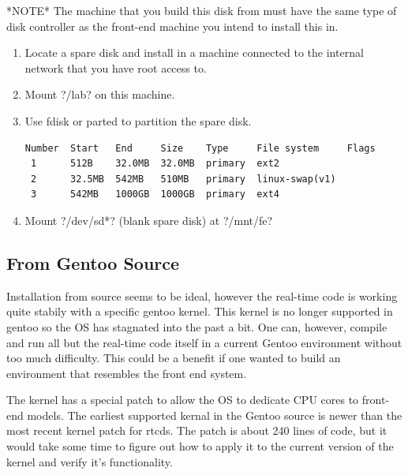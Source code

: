 *NOTE* The machine that you build this disk from must have the same type of disk controller as the front-end machine you intend to install this in.

\begin{enumerate}
    \item Locate a spare disk and install in a machine connected to the internal network that you have root access to.
    \item Mount \lstin?/lab? on this machine.
    \item Use fdisk or parted to partition the spare disk.
\begin{lstlisting}
Number  Start   End     Size    Type     File system     Flags
 1      512B    32.0MB  32.0MB  primary  ext2
 2      32.5MB  542MB   510MB   primary  linux-swap(v1)
 3      542MB   1000GB  1000GB  primary  ext4
\end{lstlisting}
    \item Mount \lstin?/dev/sd*? (blank spare disk) at \lstin?/mnt/fe?
\end{enumerate}

\subsection{From Gentoo Source}
Installation from source seems to be ideal, however the real-time code is
working quite stabily with a specific gentoo kernel. This kernel is no longer
supported in gentoo so the OS has stagnated into the past a bit. One can, however,
compile and run all but the real-time code itself in a current Gentoo environment
without too much difficulty. This could be a benefit if one wanted to build an
environment that resembles the front end system.

The kernel has a special patch to allow the OS to dedicate CPU cores to
front-end models. The earliest supported kernal in the Gentoo source is newer
than the most recent kernel patch for rtcds. The patch is about 240
lines of code, but it would take some time to figure out how to apply it to
the current version of the kernel and verify it's functionality.


